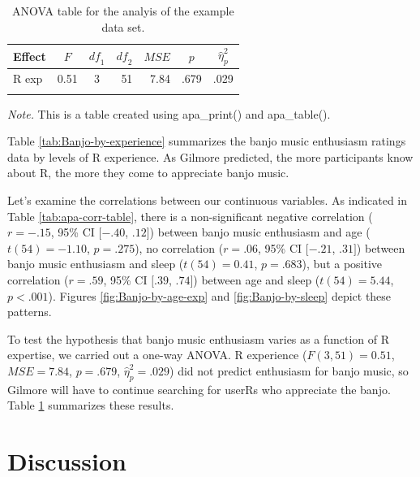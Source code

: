 \documentclass[english,man]{apa6}
\theoremstyle{definition}
\theoremstyle{definition}
\theoremstyle{definition}
\theoremstyle{remark}
\begin{document}
\begin{table}[tbp]
\begin{center}
\begin{threeparttable}
\caption{\label{tab:Banjo-aov-table}ANOVA table for the analyis of the example data set.}
\begin{tabular}{lrcrrrl}
\toprule
Effect & \multicolumn{1}{c}{$F$} & \multicolumn{1}{c}{$\mathit{df}_1$} & \multicolumn{1}{c}{$\mathit{df}_2$} & \multicolumn{1}{c}{$\mathit{MSE}$} & \multicolumn{1}{c}{$p$} & \multicolumn{1}{c}{$\hat{\eta}^2_p$}\\
\midrule
R exp & 0.51 & 3 & 51 & 7.84 & .679 & .029\\
\bottomrule
\addlinespace
\end{tabular}
\begin{tablenotes}[para]
\textit{Note.} This is a table created using apa\_print() and apa\_table().
\end{tablenotes}
\end{threeparttable}
\end{center}
\end{table}

Table \ref{tab:Banjo-by-experience} summarizes the banjo music
enthusiasm ratings data by levels of R experience. As Gilmore predicted,
the more participants know about R, the more they come to appreciate
banjo music.

Let's examine the correlations between our continuous variables. As
indicated in Table \ref{tab:apa-corr-table}, there is a non-significant
negative correlation (\(r = -.15\), 95\% CI \([-.40\), \(.12]\)) between
banjo music enthusiasm and age (\(t(54) = -1.10\), \(p = .275\)), no
correlation (\(r = .06\), 95\% CI \([-.21\), \(.31]\)) between banjo
music enthusiasm and sleep (\(t(54) = 0.41\), \(p = .683\)), but a
positive correlation (\(r = .59\), 95\% CI \([.39\), \(.74]\)) between
age and sleep (\(t(54) = 5.44\), \(p < .001\)). Figures
\ref{fig:Banjo-by-age-exp} and \ref{fig:Banjo-by-sleep} depict these
patterns.

To test the hypothesis that banjo music enthusiasm varies as a function
of R expertise, we carried out a one-way ANOVA. R experience
(\(F(3, 51) = 0.51\), \(\mathit{MSE} = 7.84\), \(p = .679\),
\(\hat{\eta}^2_p = .029\)) did not predict enthusiasm for banjo music,
so Gilmore will have to continue searching for userRs who appreciate the
banjo. Table \ref{tab:Banjo-aov-table} summarizes these results.

\section{Discussion}\label{discussion}
\end{document}
